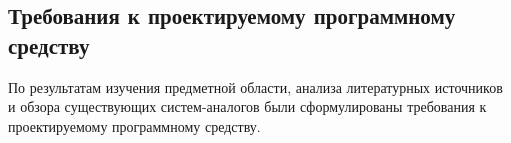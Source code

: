 \subsection{Требования к проектируемому программному средству}
\label{sec:analysis:research:req}










По результатам изучения предметной области, анализа литературных источников и обзора существующих систем-аналогов были сформулированы требования к проектируемому программному средству.